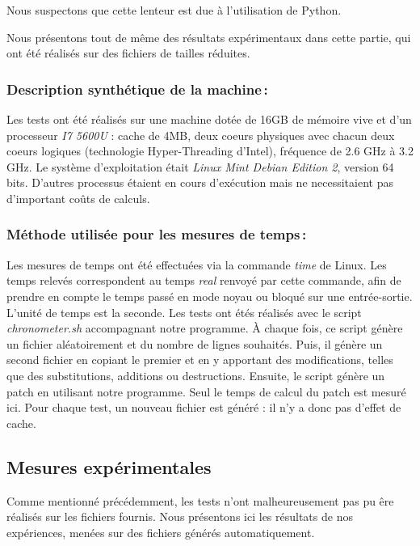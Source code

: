 \documentclass[a4paper, 10pt, french]{article}
\begin{document}
    Nous suspectons que cette lenteur est due à l'utilisation de Python.

    Nous présentons tout de même des résultats expérimentaux dans cette partie,
    qui ont été réalisés sur des fichiers de tailles réduites.

    \subsubsection{Description synthétique de la machine\,:}
      Les tests ont été réalisés sur une machine dotée de 16GB de mémoire vive et
      d'un processeur \emph{I7 5600U} : cache de 4MB, deux coeurs physiques avec
      chacun deux coeurs logiques (technologie Hyper-Threading d'Intel), fréquence
      de 2.6 GHz à 3.2 GHz.
      Le système d'exploitation était \emph{Linux Mint Debian Edition 2}, version 64 bits.
      D'autres processus étaient en cours d'exécution mais ne necessitaient pas
      d'important coûts de calculs.

    \subsubsection{Méthode utilisée pour les mesures de temps\,: }
      Les mesures de temps ont été effectuées via la commande \emph{time} de Linux.
      Les temps relevés correspondent au temps \emph{real} renvoyé par cette commande,
      afin de prendre en compte le temps passé en mode noyau ou bloqué sur une
      entrée-sortie.
      L'unité de temps est la seconde.
      Les tests ont étés réalisés avec le script \emph{chronometer.sh} accompagnant
      notre programme. À chaque fois, ce script génère un fichier aléatoirement et
      du nombre de lignes souhaités. Puis, il génère un second fichier en copiant
      le premier et en y apportant des modifications, telles que des substitutions,
      additions ou destructions. Ensuite, le script génère un patch en utilisant
      notre programme. Seul le temps de calcul du patch est mesuré ici.
      Pour chaque test, un nouveau fichier est généré : il n'y a donc pas d'effet
      de cache.

  \subsection{Mesures expérimentales}
    Comme mentionné précédemment, les tests n'ont malheureusement pas pu êre réalisés
    sur les fichiers fournis.
    Nous présentons ici les résultats de nos expériences, menées sur des fichiers
    générés automatiquement.
\end{document}
